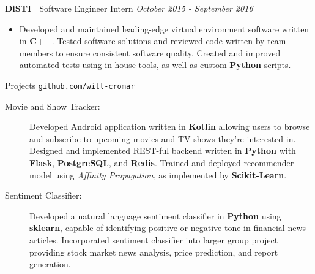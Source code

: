\documentclass[letterpaper,11pt,oneside]{article}
\newcommand{\resheader}[2][]{
  \vspace{9pt}
  {\LARGE #2} #1
  \\
}
\newcommand{\ressubheader}[3][]{
  \vspace{6pt}
  {\large \textbf{#2} #1} \hfill \emph{#3}
  \\
}
\newcommand{\resskill}[1]{\textbf{#1}}
\begin{document}
\ressubheader[| Software Engineer Intern]{DiSTI}{October 2015 - September 2016}
\begin{itemize}
  \item Developed and maintained leading-edge virtual environment software written in \resskill{C++}. Tested software solutions and reviewed code written by team members to ensure consistent software quality. Created and improved automated tests using in-house tools, as well as custom \resskill{Python} scripts.
\end{itemize}

\resheader[\hfill \texttt{github.com/will-cromar}]{Projects}
\begin{description}
  \item [Movie and Show Tracker:] Developed Android application written in \resskill{Kotlin} allowing users to browse and subscribe to upcoming movies and TV shows they're interested in. Designed and implemented REST-ful backend written in \resskill{Python} with \resskill{Flask}, \resskill{PostgreSQL}, and \resskill{Redis}. Trained and deployed recommender model using \emph{Affinity Propagation}, as implemented by \resskill{Scikit-Learn}.
   \item [Sentiment Classifier:] Developed a natural language sentiment classifier in \resskill{Python} using \resskill{sklearn}, capable of identifying positive or negative tone in financial news articles. Incorporated sentiment classifier into larger group project providing stock market news analysis, price prediction, and report generation.
\end{description}    
\end{document}
